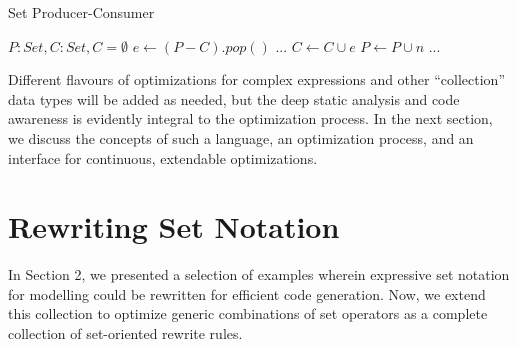 \documentclass{article}
\begin{document}
\begin{algorithm}
  \caption{Set Producer-Consumer}
  \begin{algorithmic}
    \Require $P: Set, C: Set, C = \emptyset$
      \State $e \gets (P - C).pop()$
      ... 
      \State $C \gets C \cup {e}$
      \State $P \gets P \cup {n}$ ... 
    \EndWhile
  \end{algorithmic}
  \label{fig:prodcons}
\end{algorithm}

Different flavours of optimizations for complex expressions and other ``collection'' data types will be added as needed, but the deep static analysis and code awareness is evidently integral to the optimization process. In the next section, we discuss the concepts of such a language, an optimization process, and an interface for continuous, extendable optimizations.

\section{Rewriting Set Notation}

In Section 2, we presented a selection of examples wherein expressive set notation for modelling could be rewritten for efficient code generation. Now, we extend this collection to optimize generic combinations of set operators as a complete collection of set-oriented rewrite rules.

\end{document}
